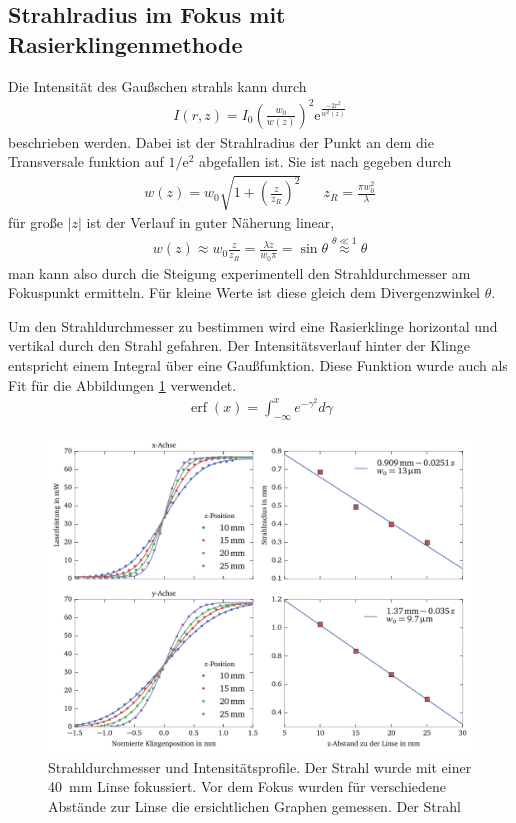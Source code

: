 \documentclass[11pt,twoside=true]{scrartcl}
\newcommand{\e}{\mathrm{e}}
\begin{document}
\subsection{Strahlradius im Fokus mit Rasierklingenmethode}
Die Intensität des Gaußschen strahls kann durch
%
\begin{align*}
  I(r, z) = I_0\left( \frac{w_0}{w(z)} \right)^2 \e^{\frac{-2 r^2}{w^2(z)}}
\end{align*}
%
beschrieben werden. Dabei ist der Strahlradius der Punkt an
dem die Transversale funktion auf $1/\e^2$ abgefallen ist. Sie ist 
nach \cite{gaussbeamwiki} gegeben durch
%
\begin{align*}
  w(z) = w_0 \sqrt{1 + \left( \frac{z}{z_R} \right)^2} && z_R = \frac{\pi w_0^2}{\lambda}
\end{align*}
%
für große $|z|$ ist der Verlauf in guter Näherung linear,
%
\begin{align*}
  w(z) \approx w_0 \frac{z}{z_R} = \frac{\lambda z}{w_0 \pi} = \sin{\theta} 
                      \overset{\theta \ll 1}{\approx} \theta
\end{align*}
%
man kann also durch die Steigung experimentell den Strahldurchmesser
am Fokuspunkt ermitteln. Für kleine Werte ist diese gleich dem Divergenzwinkel
$\theta$. 

Um den Strahldurchmesser zu bestimmen wird eine Rasierklinge horizontal und
vertikal durch den Strahl gefahren. Der Intensitätsverlauf hinter der Klinge
entspricht einem Integral über eine Gaußfunktion. Diese Funktion wurde auch
als Fit für die Abbildungen \ref{fig:beam_div} verwendet.
%
\begin{align*}
  \operatorname{erf}(x) = \int_{-\infty}^{x} e^{-\gamma^2} d\gamma
\end{align*}
%


\begin{figure}[h!]
  \centering
  \includegraphics[width=1\textwidth]{./figures/beam_div.pdf}
  \caption{Strahldurchmesser und Intensitätsprofile. Der Strahl wurde mit einer
  \SI{40}{\milli\metre} Linse fokussiert. Vor dem Fokus wurden für verschiedene 
  Abstände zur Linse die ersichtlichen Graphen gemessen. Der Strahl}
  \label{fig:beam_div}
\end{figure}
\end{document}
